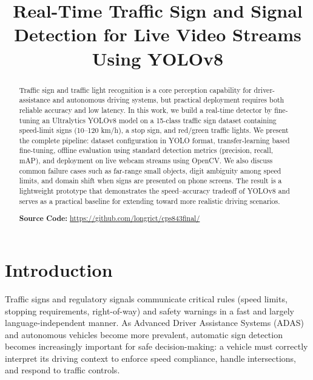 \documentclass[conference]{IEEEtran}
\begin{document}
\title{Real-Time Traffic Sign and Signal Detection for Live Video Streams Using YOLOv8}

\author{
}

\maketitle

\begin{abstract}
Traffic sign and traffic light recognition is a core perception capability for driver-assistance and autonomous driving systems, but practical deployment requires both reliable accuracy and low latency. In this work, we build a real-time detector by fine-tuning an Ultralytics YOLOv8 model on a 15-class traffic sign dataset containing speed-limit signs (10--120 km/h), a stop sign, and red/green traffic lights. We present the complete pipeline: dataset configuration in YOLO format, transfer-learning based fine-tuning, offline evaluation using standard detection metrics (precision, recall, mAP), and deployment on live webcam streams using OpenCV. We also discuss common failure cases such as far-range small objects, digit ambiguity among speed limits, and domain shift when signs are presented on phone screens. The result is a lightweight prototype that demonstrates the speed--accuracy tradeoff of YOLOv8 and serves as a practical baseline for extending toward more realistic driving scenarios.

\vspace{0.4em}
\noindent\textbf{Source Code:} \url{https://github.com/longrict/cps843final/}
\end{abstract}

\section{Introduction}
Traffic signs and regulatory signals communicate critical rules (speed limits, stopping requirements, right-of-way) and safety warnings in a fast and largely language-independent manner. As Advanced Driver Assistance Systems (ADAS) and autonomous vehicles become more prevalent, automatic sign detection becomes increasingly important for safe decision-making: a vehicle must correctly interpret its driving context to enforce speed compliance, handle intersections, and respond to traffic controls.
\end{document}
